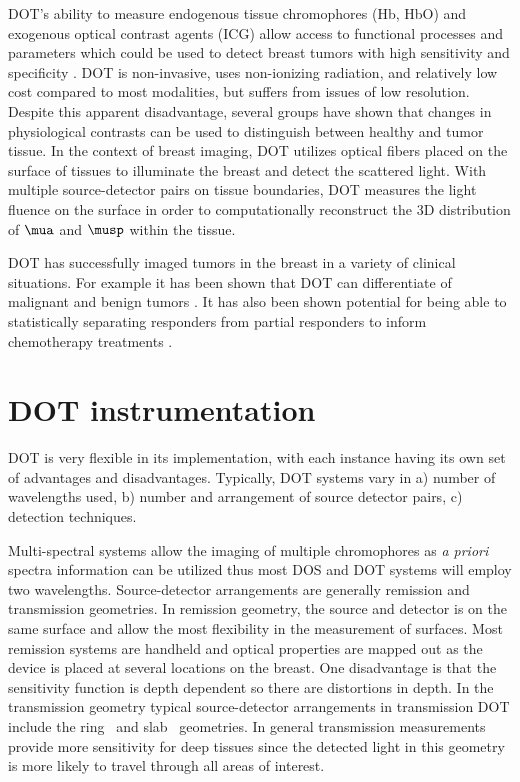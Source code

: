DOT's ability to measure endogenous tissue chromophores (Hb, HbO) and exogenous optical contrast agents (ICG) allow access to functional processes and parameters which could be used to detect breast tumors with high sensitivity and specificity \cite{Zhao2015,Choe2009}. DOT is non-invasive, uses non-ionizing radiation, and relatively low cost compared to most modalities, but suffers from issues of low resolution. Despite this apparent disadvantage, several groups have shown that changes in physiological contrasts can be used to distinguish between healthy and tumor tissue. In the context of breast imaging, DOT utilizes optical fibers placed on the surface of tissues to illuminate the breast and detect the scattered light. With multiple source-detector pairs on tissue boundaries, DOT measures the light fluence on the surface in order to computationally reconstruct the 3D distribution of $\mua$ and $\musp$ within the tissue.

DOT has successfully imaged tumors in the breast in a variety of clinical situations. For example it has been shown that DOT can differentiate of malignant and benign tumors \cite{Choe2009}. It has also been shown potential for being able to statistically separating responders from partial responders to inform chemotherapy treatments \cite{Tromberg2005,Busch2013}. 

\section{DOT instrumentation}
DOT is very flexible in its implementation, with each instance having its own set of advantages and disadvantages. Typically, DOT systems vary in a) number of wavelengths used, b) number and arrangement of source detector pairs, c) detection techniques.

Multi-spectral systems allow the imaging of multiple chromophores as \textit{a priori} spectra information can be utilized thus most DOS and DOT systems will employ two wavelengths. Source-detector arrangements are generally remission and transmission geometries. In remission geometry, the source and detector is on the same surface and allow the most flexibility in the measurement of surfaces. Most remission systems are handheld and optical properties are mapped out as the device is placed at several locations on the breast. One disadvantage is that the sensitivity function is depth dependent so there are distortions in depth. 
In the transmission geometry typical source-detector arrangements in transmission DOT include the ring~\cite{pogue_95_1} and slab~\cite{grosenick_05_1,pifferi_03_1,choe_09_1} geometries. In general transmission measurements provide more sensitivity for deep tissues since the detected light in this geometry is more likely to travel through all areas of interest.

